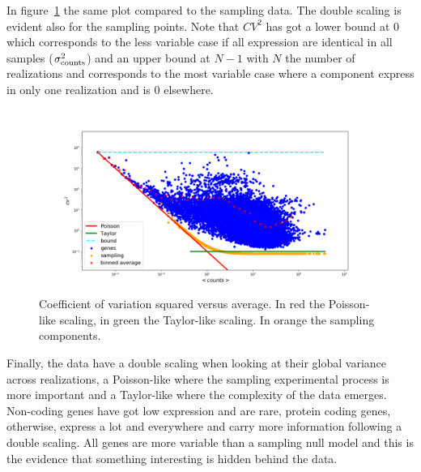 In figure~\ref{fig:scalinglaws/gtex/cvmean_loglog_sampling} the same plot compared to the sampling data. The double scaling is evident also for the sampling points. Note that $CV^2$ has got a lower bound at $0$ which corresponds to the less variable case if all expression are identical in all samples ($\sigma^2_{\mathrm{counts}}$) and an upper bound at $N-1$ with $N$ the number of realizations and corresponds to the most variable case where a component  express in only one realization and is $0$ elsewhere.
\begin{figure}[htb!]
    \centering
    \includegraphics[width=0.9\linewidth]{pictures/scalinglaws/gtex/cvmean_loglog_sampling.png}
    \caption{Coefficient of variation squared versus average. In \textcolor{pythonred}{red} the Poisson-like scaling, in \textcolor{pythongreen}{green} the Taylor-like scaling. In \textcolor{pythonorange}{orange} the sampling components.}
    \label{fig:scalinglaws/gtex/cvmean_loglog_sampling}
\end{figure}

Finally, the data have a double scaling when looking at their global variance across realizations, a Poisson-like where the sampling experimental process is more important and a Taylor-like where the complexity of the data emerges.
Non-coding genes have got low expression and are rare, protein coding genes, otherwise, express a lot and everywhere and carry more information following a double scaling. All genes are more variable than a sampling null model and this is the evidence that something interesting is hidden behind the data.
